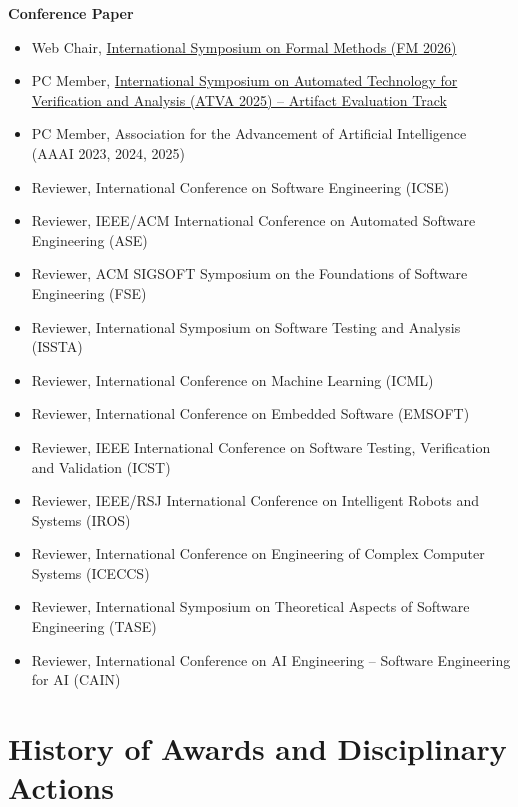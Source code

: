 \documentclass[11pt,a4paper]{moderncv}        %
\newcommand{\subsubsection}[1]{%
  \par\vspace{0.5em}%
  {\color{color1}\bfseries #1}%
  \par\vspace{0.25em}%
}
\begin{document}
\subsubsection{Conference Paper}

\begin{itemize}
    \item Web Chair, \href{https://conf.researchr.org/committee/fm-2026/fm-2026-organizing-committee}{International Symposium on Formal Methods (FM 2026)}
    \item PC Member, \href{https://conf.researchr.org/committee/atva-2025/atva-2025-artifact-evaluation-committee}{International Symposium on Automated Technology for Verification and Analysis (ATVA 2025) – Artifact Evaluation Track}
    \item PC Member, Association for the Advancement of Artificial Intelligence (AAAI 2023, 2024, 2025)
    \item Reviewer, International Conference on Software Engineering (ICSE)
    \item Reviewer, IEEE/ACM International Conference on Automated Software Engineering (ASE)
    \item Reviewer, ACM SIGSOFT Symposium on the Foundations of Software Engineering (FSE)
    \item Reviewer, International Symposium on Software Testing and Analysis (ISSTA)
    \item Reviewer, International Conference on Machine Learning (ICML)
    \item Reviewer, International Conference on Embedded Software (EMSOFT)
    \item Reviewer, IEEE International Conference on Software Testing, Verification and Validation (ICST)
    \item Reviewer, IEEE/RSJ International Conference on Intelligent Robots and Systems (IROS)    
    \item Reviewer, International Conference on Engineering of Complex Computer Systems (ICECCS)
    \item Reviewer, International Symposium on Theoretical Aspects of Software Engineering (TASE)
    \item Reviewer, International Conference on AI Engineering – Software Engineering for AI (CAIN)
\end{itemize}



\section{History of Awards and Disciplinary Actions}
\end{document}
